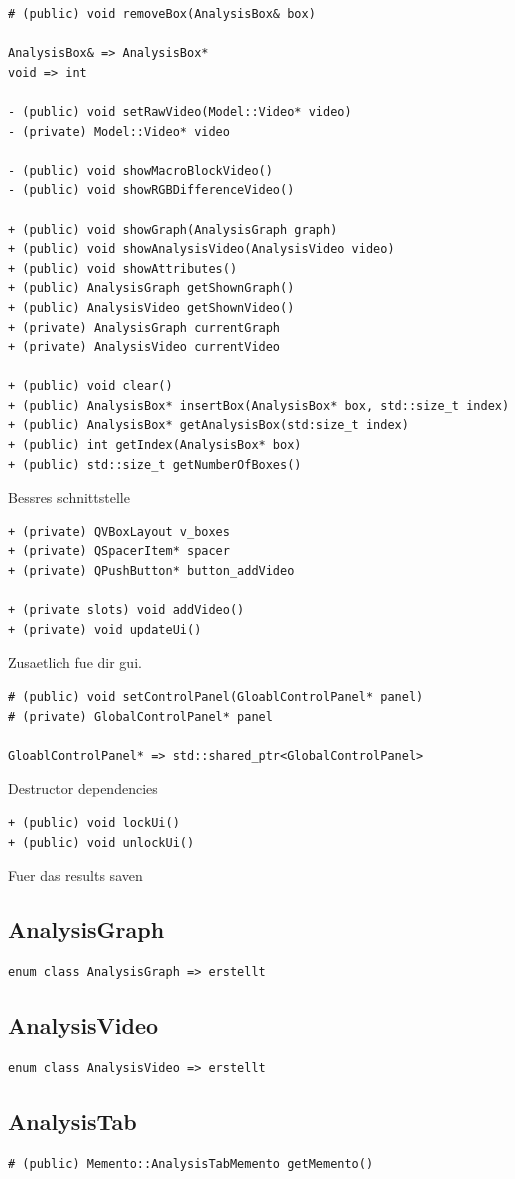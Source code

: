 \documentclass{scrartcl}
\begin{document}
{\begin{verbatim}
# (public) void removeBox(AnalysisBox& box)

AnalysisBox& => AnalysisBox*
void => int

- (public) void setRawVideo(Model::Video* video)
- (private) Model::Video* video

- (public) void showMacroBlockVideo()
- (public) void showRGBDifferenceVideo()

+ (public) void showGraph(AnalysisGraph graph)
+ (public) void showAnalysisVideo(AnalysisVideo video)
+ (public) void showAttributes()
+ (public) AnalysisGraph getShownGraph()
+ (public) AnalysisVideo getShownVideo()
+ (private) AnalysisGraph currentGraph
+ (private) AnalysisVideo currentVideo

+ (public) void clear()
+ (public) AnalysisBox* insertBox(AnalysisBox* box, std::size_t index)
+ (public) AnalysisBox* getAnalysisBox(std:size_t index)
+ (public) int getIndex(AnalysisBox* box)
+ (public) std::size_t getNumberOfBoxes()
\end{verbatim}
Bessres schnittstelle
\begin{verbatim}
+ (private) QVBoxLayout v_boxes
+ (private) QSpacerItem* spacer
+ (private) QPushButton* button_addVideo

+ (private slots) void addVideo()
+ (private) void updateUi()
\end{verbatim}
Zusaetlich fue dir gui.
\begin{verbatim}
# (public) void setControlPanel(GloablControlPanel* panel)
# (private) GlobalControlPanel* panel

GloablControlPanel* => std::shared_ptr<GlobalControlPanel>
\end{verbatim}
Destructor dependencies
\begin{verbatim}
+ (public) void lockUi()
+ (public) void unlockUi()
\end{verbatim}
Fuer das results saven
\subsection{AnalysisGraph}
\begin{verbatim}
enum class AnalysisGraph => erstellt
\end{verbatim}
\subsection{AnalysisVideo}
\begin{verbatim}
enum class AnalysisVideo => erstellt
\end{verbatim}
\subsection{AnalysisTab}
\begin{verbatim}
# (public) Memento::AnalysisTabMemento getMemento()


\end{verbatim}}
\end{document}
